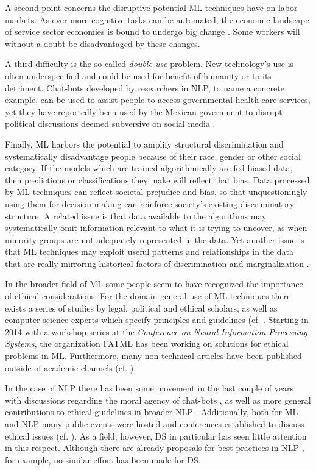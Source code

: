 \documentclass{article}
\begin{document}
A second point concerns the disruptive potential ML techniques have on labor markets. As ever more cognitive tasks can be automated, the economic landscape of service sector economies is bound to undergo big change \cite{west2015happens}. Some workers will without a doubt be disadvantaged by these changes. 

A third difficulty is the so-called \emph{double use} problem. New technology's use is often underspecified and could be used for benefit of humanity or to its detriment. Chat-bots developed by researchers in NLP, to name a concrete example, can be used to assist people to access governmental health-care services, yet they have reportedly been used by the Mexican government to disrupt political discussions deemed subversive on social media \cite{leidner2017ethical}.

Finally, ML harbors the potential to amplify structural discrimination and systematically disadvantage people because of their race, gender or other social category. If the models which are trained algorithmically are fed biased data, then predictions or classifications they make will reflect that bias.
Data processed by ML techniques can reflect societal prejudice and bias, so that unquestioningly using them for decision making can reinforce society's existing discriminatory structure. A related issue is that data available to the algorithms may systematically omit information relevant to what it is trying to uncover, as when minority groups are not adequately represented in the data. Yet another issue is that ML techniques may exploit useful patterns and relationships in the data that are really mirroring historical factors of discrimination and marginalization \cite{barocas2016big}.

In the broader field of ML some people seem to have recognized the importance of ethical considerations. For the domain-general use of ML techniques there exists a series of studies by legal, political and ethical scholars, as well as computer science experts which specify principles and guidelines (cf. \cite{pasquale2015black}\cite{feldman2015certifying}\cite{barocas2016big}. Starting in 2014 with a workshop series at the \emph{Conference on Neural Information Processing Systems}, the organization FATML has been working on solutions for ethical problems in ML. Furthermore, many non-technical articles have been published outside of academic channels (cf. \cite{new2016}\cite{algorithms2016}). 

In the case of NLP there has been some movement in the last couple of years with discussions regarding the moral agency of chat-bots \cite{thieltges2016devil}, as well as more general contributions to ethical guidelines in broader NLP \cite{hovy2016social}.
Additionally, both for ML and NLP many public events were hosted and conferences established to discuss ethical issues (cf. \cite{conferences}).
As a field, however, DS in particular has seen little attention in this respect. Although there are already proposals for best practices in NLP \cite{leidner2017ethical}, for example, no similar effort has been made for DS.
\end{document}
